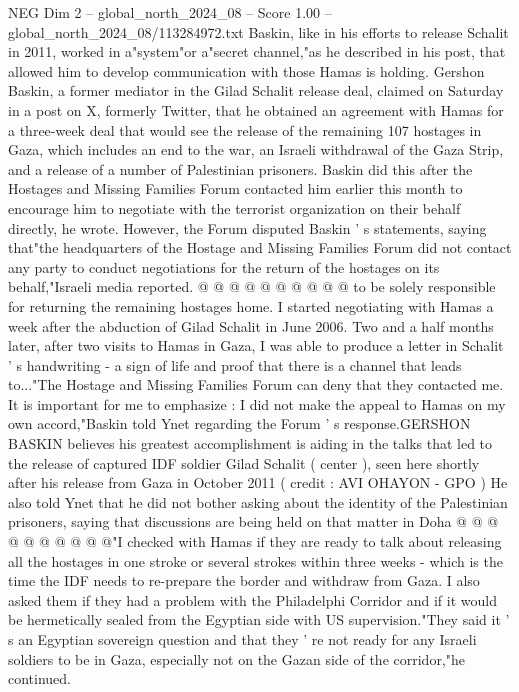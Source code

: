 \begin{textsample}{NEG Dim 2 – global\_north\_2024\_08 – Score 1.00 – global\_north\_2024\_08/113284972.txt}  \label{ex:f2_neg_356}
Baskin, like in his efforts to release Schalit in 2011, worked in a"system"or a"secret channel,"as he described in his post, that allowed him to develop communication with those Hamas is holding.
Gershon Baskin, a former mediator in the Gilad Schalit release deal, claimed on Saturday in a post on X, formerly Twitter, that he obtained an agreement with Hamas for a three-week deal that would see the release of the remaining 107 hostages in Gaza, which includes an end to the war, an Israeli withdrawal of the Gaza Strip, and a release of a number of Palestinian prisoners.
Baskin did this after the Hostages and Missing Families Forum contacted him earlier this month to encourage him to negotiate with the terrorist organization on their behalf directly, he wrote.
However, the Forum disputed Baskin ' s statements, saying that"the headquarters of the Hostage and Missing Families Forum did not contact any party to conduct negotiations for the return of the hostages on its behalf,"Israeli media reported. @ @ @ @ @ @ @ @ @ @ to be solely responsible for returning the remaining hostages home.
I started negotiating with Hamas a week after the abduction of Gilad Schalit in June 2006.
Two and a half months later, after two visits to Hamas in Gaza, I was able to produce a letter in Schalit ' s handwriting - a sign of life and proof that there is a channel that leads to..."The Hostage and Missing Families Forum can deny that they contacted me.
It is important for me to emphasize : I did not make the appeal to Hamas on my own accord,"Baskin told Ynet regarding the Forum ' s response.GERSHON BASKIN believes his greatest accomplishment is aiding in the talks that led to the release of captured IDF soldier Gilad Schalit ( center ), seen here shortly after his release from Gaza in October 2011 ( credit : AVI OHAYON - GPO ) He also told Ynet that he did not bother asking about the identity of the Palestinian prisoners, saying that discussions are being held on that matter in Doha @ @ @ @ @ @ @ @ @ @"I checked with Hamas if they are ready to talk about releasing all the hostages in one stroke or several strokes within three weeks - which is the time the IDF needs to re-prepare the border and withdraw from Gaza.
I also asked them if they had a problem with the Philadelphi Corridor and if it would be hermetically sealed from the Egyptian side with US supervision."They said it ' s an Egyptian sovereign question and that they ' re not ready for any Israeli soldiers to be in Gaza, especially not on the Gazan side of the corridor,"he continued.

\end{textsample}
